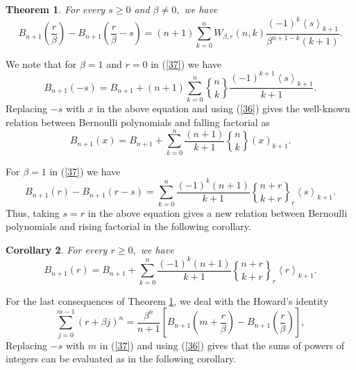 \documentclass{article}%
\newtheorem{theorem}{Theorem}
\newtheorem{corollary}[theorem]{Corollary}
\begin{document}
\begin{theorem}
\label{teo1}For every $s\geq0$ and $\beta\neq0,$ we have%
\begin{equation}
B_{n+1}\left(  \frac{r}{\beta}\right)  -B_{n+1}\left(  \frac{r}{\beta
}-s\right)  =\left(  n+1\right)  \sum_{k=0}^{n}W_{\beta,r}\left(  n,k\right)
\frac{\left(  -1\right)  ^{k}\left\langle s\right\rangle _{k+1}}{\beta
^{n+1-k}\left(  k+1\right)  }. \label{37}%
\end{equation}

\end{theorem}

We note that for $\beta=1$ and $r=0$ in (\ref{37}) we have
\[
B_{n+1}\left(  -s\right)  =B_{n+1}+\left(  n+1\right)  \sum_{k=0}^{n}%
\genfrac{\{}{\}}{0pt}{}{n}{k}%
\frac{\left(  -1\right)  ^{k+1}\left\langle s\right\rangle _{k+1}}{k+1}.
\]
Replacing $-s$ with $x$ in the above equation and using (\ref{36}) gives the
well-known relation between Bernoulli polynomials and falling factorial as
\cite[Eq. (15.39)]{Gould}\textbf{ }%
\[
B_{n+1}\left(  x\right)  =B_{n+1}+\sum_{k=0}^{n}\frac{\left(  n+1\right)
}{k+1}%
\genfrac{\{}{\}}{0pt}{}{n}{k}%
\left(  x\right)  _{k+1}.
\]


For $\beta=1$ in (\ref{37}) we have%
\[
B_{n+1}\left(  r\right)  -B_{n+1}\left(  r-s\right)  =\sum_{k=0}^{n}%
\frac{\left(  -1\right)  ^{k}\left(  n+1\right)  }{k+1}%
\genfrac{\{}{\}}{0pt}{}{n+r}{k+r}%
_{r}\left\langle s\right\rangle _{k+1}.
\]
Thus, taking $s=r$ in the above equation gives a new relation between
Bernoulli polynomials and rising factorial in the following corollary.

\begin{corollary}
For every $r\geq0,$ we have
\[
B_{n+1}\left(  r\right)  =B_{n+1}+\sum_{k=0}^{n}\frac{\left(  -1\right)
^{k}\left(  n+1\right)  }{k+1}%
\genfrac{\{}{\}}{0pt}{}{n+r}{k+r}%
_{r}\left\langle r\right\rangle _{k+1}.
\]

\end{corollary}

For the last consequences of Theorem \ref{teo1}, we deal with the Howard's
identity \cite[Eq. (4.3)]{Howard2}%
\[
\sum_{j=0}^{m-1}\left(  r+\beta j\right)  ^{n}=\frac{\beta^{n}}{n+1}\left[
B_{n+1}\left(  m+\frac{r}{\beta}\right)  -B_{n+1}\left(  \frac{r}{\beta
}\right)  \right]  ,
\]
Replacing $-s$ with $m$ in (\ref{37}) and using (\ref{36}) gives that the sums
of powers of integers can be evaluated as in the following corollary.
\end{document}
